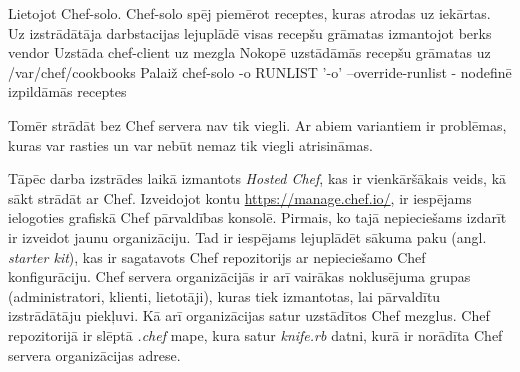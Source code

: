Lietojot Chef-solo.
Chef-solo spēj piemērot receptes, kuras atrodas uz iekārtas.
Uz izstrādātāja darbstacijas lejuplādē visas recepšu grāmatas izmantojot berks vendor
Uzstāda chef-client uz mezgla
Nokopē uzstādāmās recepšu grāmatas uz /var/chef/cookbooks
Palaiž chef-solo -o RUNLIST
'-o' --override-runlist	- nodefinē izpildāmās receptes

Tomēr strādāt bez Chef servera nav tik viegli. Ar abiem variantiem ir problēmas, kuras var rasties un var nebūt nemaz tik viegli atrisināmas.

Tāpēc darba izstrādes laikā izmantots \textit{Hosted Chef}, kas ir vienkāršākais veids, kā sākt strādāt ar Chef.
Izveidojot kontu \url{https://manage.chef.io/}, ir iespējams ielogoties grafiskā Chef pārvaldības konsolē.
Pirmais, ko tajā nepieciešams izdarīt ir izveidot jaunu organizāciju. Tad ir iespējams lejuplādēt sākuma paku (angl. \textit{starter kit}), kas ir sagatavots Chef repozitorijs ar nepieciešamo Chef konfigurāciju. Chef servera organizācijās ir arī vairākas noklusējuma grupas (administratori, klienti, lietotāji), kuras tiek izmantotas, lai pārvaldītu izstrādātāju piekļuvi. Kā arī organizācijas satur uzstādītos Chef mezglus. Chef repozitorijā ir slēptā \textit{.chef} mape, kura satur \textit{knife.rb} datni, kurā ir norādīta Chef servera organizācijas adrese.
